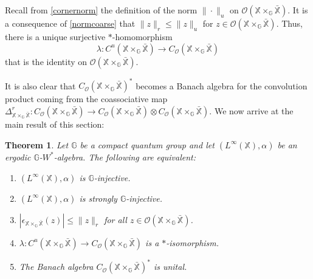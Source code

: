 \documentclass[reqno]{amsart}
\numberwithin{equation}{section}
\newtheorem{Theorem}{Theorem}[section]
\newcommand\XGX{\X\times_\G \bar{\X}}
\newcommand{\mcO}{\mathcal{O}}
\newcommand{\G}{\mathbb{G}}
\newcommand{\X}{\mathbb{X}}
\begin{document}
Recall from \eqref{cornernorm} the definition of the norm $\|\cdot\|_u$ on $\mcO(\XGX)$.
 It is a consequence of \eqref{normcoarse} that $\|z\|_r\le \|z\|_u$ for $z\in \mcO(\XGX)$. Thus, there is a unique surjective $*$-homomorphism $$\lambda: C^u(\XGX)\to C_\mcO(\XGX)$$
that is the identity on $\mcO(\XGX)$.

 It is also clear that $C_\mcO(\XGX)^*$
 becomes a Banach algebra for the convolution product coming from the coassociative map $\Delta_{\XGX}^r: C_\mcO(\XGX)\to C_\mcO(\XGX)\otimes C_\mcO(\XGX)$.
We now arrive at the main result of this section:

\begin{Theorem}\label{counitbounded} Let $\G$ be a compact quantum group and let $(L^\infty(\X), \alpha)$ be an ergodic $\G$-$W^*$-algebra. The following are equivalent:
\begin{enumerate}
    \item $(L^\infty(\X), \alpha)$ is $\G$-injective.
    \item\vspace{-1.5mm}$(L^\infty(\X), \alpha)$ is strongly $\G$-injective.
    \item\vspace{-1.5mm} $|\epsilon_{\XGX}(z)| \le \|z\|_r$ for all $z\in \mcO(\XGX)$.
    \item\vspace{-1.5mm} $\lambda: C^u(\XGX)\to C_\mcO(\XGX)$ is a $*$-isomorphism. 
     \item\vspace{-1.5mm} The Banach algebra $C_\mcO(\XGX)^*$ is unital.
\end{enumerate}

\end{Theorem}
\end{document}
